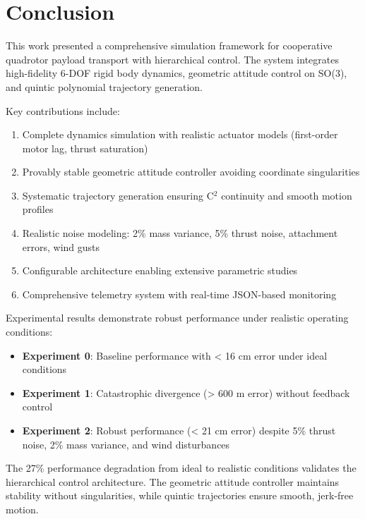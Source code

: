 \documentclass[12pt,a4paper]{article}
\begin{document}
\section{Conclusion}
\label{sec:conclusion}

This work presented a comprehensive simulation framework for cooperative quadrotor payload transport with hierarchical control. The system integrates high-fidelity 6-DOF rigid body dynamics, geometric attitude control on SO(3), and quintic polynomial trajectory generation.

Key contributions include:
\begin{enumerate}
    \item Complete dynamics simulation with realistic actuator models (first-order motor lag, thrust saturation)
    \item Provably stable geometric attitude controller avoiding coordinate singularities
    \item Systematic trajectory generation ensuring C$^2$ continuity and smooth motion profiles
    \item Realistic noise modeling: 2\% mass variance, 5\% thrust noise, attachment errors, wind gusts
    \item Configurable architecture enabling extensive parametric studies
    \item Comprehensive telemetry system with real-time JSON-based monitoring
\end{enumerate}

Experimental results demonstrate robust performance under realistic operating conditions:
\begin{itemize}
    \item \textbf{Experiment 0}: Baseline performance with < 16 cm error under ideal conditions
    \item \textbf{Experiment 1}: Catastrophic divergence (> 600 m error) without feedback control
    \item \textbf{Experiment 2}: Robust performance (< 21 cm error) despite 5\% thrust noise, 2\% mass variance, and wind disturbances
\end{itemize}

The 27\% performance degradation from ideal to realistic conditions validates the hierarchical control architecture. The geometric attitude controller maintains stability without singularities, while quintic trajectories ensure smooth, jerk-free motion.
\end{document}
